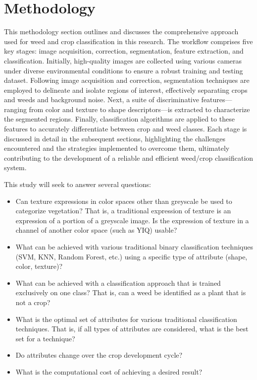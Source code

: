 \documentclass[letterpaper, notitlepage]{report}
\begin{document}
\chapter{Methodology}
\label{section:methodology}
This methodology section outlines and discusses the comprehensive approach used for weed and crop classification in this research. The workflow comprises five key stages: image acquisition, correction, segmentation, feature extraction, and classification. Initially, high-quality images are collected using various cameras under diverse environmental conditions to ensure a robust training and testing dataset. Following image acquisition and correction, segmentation techniques are employed to delineate and isolate regions of interest, effectively separating crops and weeds and background noise. Next, a suite of discriminative features—ranging from color and texture to shape descriptors—is extracted to characterize the segmented regions. Finally,  classification algorithms are applied to these features to accurately differentiate between crop and weed classes. Each stage is discussed in detail in the subsequent sections, highlighting the challenges encountered and the strategies implemented to overcome them, ultimately contributing to the development of a reliable and efficient weed/crop classification system.

This study will seek to answer several questions:
\begin{itemize}
	\item{Can texture expressions in color spaces other than greyscale be used to categorize vegetation? That is, a traditional expression of texture is an expression of a portion of a greyscale image. Is the expression of texture in a channel of another color space (such as YIQ) usable?}
	\item{What can be achieved with various traditional binary classification techniques (SVM, KNN, Random Forest, etc.) using a specific type of attribute (shape, color, texture)?}
	\item{What can be achieved with a classification approach that is trained exclusively on one class? That is, can a weed be identified as a plant that is not a crop?}
	\item{What is the optimal set of attributes for various traditional classification techniques. That is, if all types of attributes are considered, what is the best set for a technique?}
	\item{Do attributes change over the crop development cycle?}
	\item{What is the computational cost of achieving a desired result?}
\end{itemize}
\end{document}

